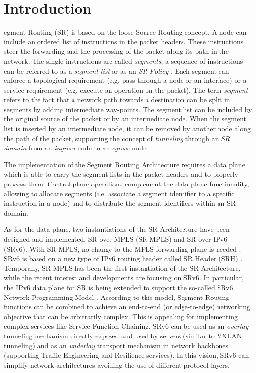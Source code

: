 \section{Introduction}
\label{sec:intro}

egment Routing (SR) is based on the loose Source Routing concept. A node can include an ordered list of instructions in the packet headers. These instructions steer the forwarding and the processing of the packet along its path in the network. The single instructions are called \textit{segments}, a sequence of instructions can be referred to as a \textit{segment list} or as an \textit{SR Policy} . Each segment can enforce a topological requirement (e.g. pass through a node or an interface) or a service requirement (e.g. execute an operation on the packet). The term \textit{segment} refers to the fact that a network path towards a destination can be split in segments by adding intermediate way-points. The segment list can be included by the original source of the packet or by an intermediate node. When the segment list is inserted by an intermediate node, it can be removed by another node along the path of the packet, supporting the concept of \textit{tunneling} through an \textit{SR domain} from an \textit{ingress} node to an \textit{egress} node. 

The implementation of the Segment Routing Architecture requires a data plane which is able to carry the segment lists in the packet headers and to properly process them. Control plane operations complement the data plane functionality, allowing to allocate segments (i.e. associate a segment identifier to a specific instruction in a node) and to distribute the segment identifiers within an SR domain.

As for the data plane, two instantiations of the SR Architecture have been designed and implemented, SR over MPLS (SR-MPLS) and SR over IPv6 (SRv6). With SR-MPLS, no change to the MPLS forwarding plane is needed \cite{id-segment-routing-mpls}. SRv6 is based on a new type of IPv6 routing header called SR Header (SRH) \cite{ietf-6man-segment-routing-header}. Temporally, SR-MPLS has been the first instantiation of the SR Architecture, while the recent interest and developments are focusing on SRv6. In particular, the IPv6 data plane for SR is being extended to support the so-called SRv6 Network Programming Model \cite{id-srv6-network-prog}. According to this model, Segment Routing functions can be combined to achieve an end-to-end (or edge-to-edge) networking objective that can be arbitrarily complex. This is appealing for implementing complex services like Service Function Chaining. SRv6 can be used as an \textit{overlay} tunneling mechanism directly exposed and used by servers (similar to VXLAN tunneling) and as an \textit{underlay} transport mechanism in network backbones (supporting Traffic Engineering and Resilience services). In this vision, SRv6 can simplify network architectures avoiding the use of different protocol layers. 

